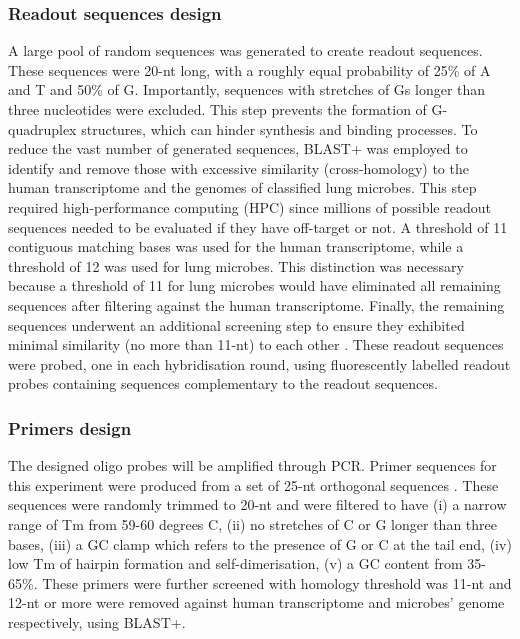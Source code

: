 \documentclass[10pt,letterpaper]{article}
\begin{document}
\subsubsection*{Readout sequences design}
A large pool of random sequences was generated to create readout sequences. These sequences were 20-nt long, with a roughly equal probability of 25\% of A and T and 50\% of G. Importantly, sequences with stretches of Gs longer than three nucleotides were excluded. This step prevents the formation of G-quadruplex structures, which can hinder synthesis and binding processes.
To reduce the vast number of generated sequences, BLAST+ was employed to identify and remove those with excessive similarity (cross-homology) to the human transcriptome and the genomes of classified lung microbes. This step required high-performance computing (HPC) since millions of possible readout sequences needed to be evaluated if they have off-target or not. A threshold of 11 contiguous matching bases was used for the human transcriptome, while a threshold of 12 was used for lung microbes. This distinction was necessary because a threshold of 11 for lung microbes would have eliminated all remaining sequences after filtering against the human transcriptome. Finally, the remaining sequences underwent an additional screening step to ensure they exhibited minimal similarity (no more than 11-nt) to each other \parencite{chen-2015}. These readout sequences were probed, one in each hybridisation round, using fluorescently labelled readout probes containing sequences complementary to the readout sequences. 

\subsubsection*{Primers design}
The designed oligo probes will be amplified through PCR. Primer sequences for this experiment were produced from a set of 25-nt orthogonal sequences \parencite{xu-2009}. These sequences were randomly trimmed to 20-nt and were filtered to have (i) a narrow range of Tm from 59-60 degrees C, (ii) no stretches of C or G longer than three bases, (iii) a GC clamp which refers to the presence of G or C at the tail end, (iv) low Tm of hairpin formation and self-dimerisation, (v) a GC content from 35-65\%. These primers were further screened with homology threshold was 11-nt and 12-nt or more were removed against human transcriptome and microbes' genome respectively, using BLAST+. 
\end{document}

